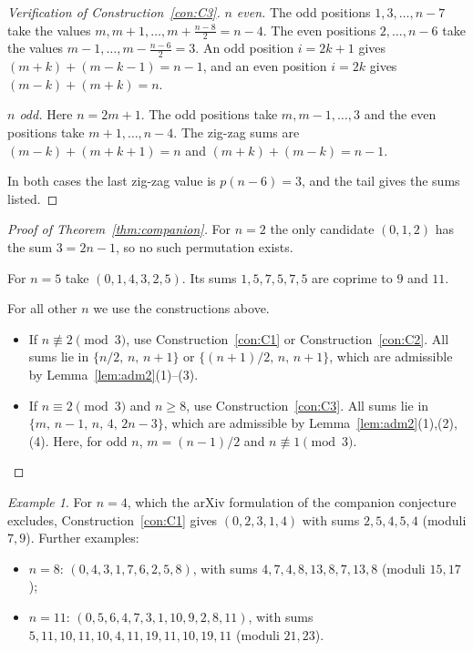 \documentclass[11pt]{article}
\numberwithin{equation}{section}
\theoremstyle{definition}
\theoremstyle{remark}
\newtheorem{example}[theorem]{Example}
\begin{document}
\begin{proof}[Verification of Construction~\ref{con:C3}]
\emph{$n$ even.} The odd positions $1,3,\dots,n-7$ take the values $m,m+1,\dots,m+\frac{n-8}2=n-4$.
The even positions $2,\dots,n-6$ take the values $m-1,\dots,m-\frac{n-6}2=3$. An odd position
$i=2k+1$ gives $(m+k)+(m-k-1)=n-1$, and an even position $i=2k$ gives $(m-k)+(m+k)=n$.

\emph{$n$ odd.} Here $n=2m+1$. The odd positions take $m,m-1,\dots,3$ and the even positions take
$m+1,\dots,n-4$. The zig-zag sums are $(m-k)+(m+k+1)=n$ and $(m+k)+(m-k)=n-1$.

In both cases the last zig-zag value is $p(n-6)=3$, and the tail gives the sums listed.
\end{proof}

\begin{proof}[Proof of Theorem~\ref{thm:companion}]
For $n=2$ the only candidate $(0,1,2)$ has the sum $3=2n-1$, so no such permutation exists.

For $n=5$ take $(0,1,4,3,2,5)$. Its sums $1,5,7,5,7,5$ are coprime to $9$ and $11$.

For all other $n$ we use the constructions above.
\begin{itemize}
  \item If $n\not\equiv2\pmod 3$, use Construction~\ref{con:C1} or Construction~\ref{con:C2}. All sums lie in
  $\{n/2,\,n,\,n+1\}$ or $\{(n+1)/2,\,n,\,n+1\}$, which are admissible by Lemma~\ref{lem:adm2}(1)--(3).
  \item If $n\equiv2\pmod 3$ and $n\ge8$, use Construction~\ref{con:C3}. All sums lie in
  $\{m,\,n-1,\,n,\,4,\,2n-3\}$, which are admissible by Lemma~\ref{lem:adm2}(1),(2),(4). Here, for odd $n$,
  $m=(n-1)/2$ and $n\not\equiv1\pmod 3$. \qedhere
\end{itemize}
\end{proof}

\begin{example}
For $n=4$, which the arXiv formulation of the companion conjecture excludes,
Construction~\ref{con:C1} gives $(0,2,3,1,4)$ with sums $2,5,4,5,4$
(moduli $7,9$). Further examples:
\begin{itemize}
  \item $n=8$: $(0,4,3,1,7,6,2,5,8)$, with sums $4,7,4,8,13,8,7,13,8$ (moduli $15,17$);
  \item $n=11$: $(0,5,6,4,7,3,1,10,9,2,8,11)$, with sums $5,11,10,11,10,4,11,19,11,10,19,11$
  (moduli $21,23$).
\end{itemize}
\end{example}
\end{document}
